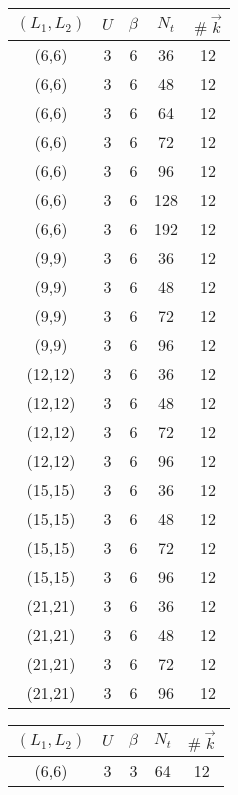\begin{table}[!htb]
  \setlength{\tabcolsep}{4pt}
    \centering
    \begin{tabular}[t]{ccccc}
        $(L_1,L_2)$ & $U$ & $\beta$ & $N_t$ & $\textit{\#}\:\vec{k}$ \\
        \hline
        (6,6) & 3 & 6 & 36 & 12
        \\
        (6,6) & 3 & 6 & 48 & 12
        \\
        (6,6) & 3 & 6 & 64 & 12
        \\
        (6,6) & 3 & 6 & 72 & 12
        \\
        (6,6) & 3 & 6 & 96 & 12
        \\
        (6,6) & 3 & 6 & 128 & 12
        \\
        (6,6) & 3 & 6 & 192 & 12
        \\
        \hline
        (9,9) & 3 & 6 & 36 & 12
        \\
        (9,9) & 3 & 6 & 48 & 12
        \\
        (9,9) & 3 & 6 & 72 & 12
        \\
        (9,9) & 3 & 6 & 96 & 12
        \\
        \hline
        (12,12) & 3 & 6 & 36 & 12
        \\
        (12,12) & 3 & 6 & 48 & 12
        \\
        (12,12) & 3 & 6 & 72 & 12
        \\
        (12,12) & 3 & 6 & 96 & 12
        \\
        \hline
        (15,15) & 3 & 6 & 36 & 12
        \\
        (15,15) & 3 & 6 & 48 & 12
        \\
        (15,15) & 3 & 6 & 72 & 12
        \\
        (15,15) & 3 & 6 & 96 & 12
        \\
        \hline
        (21,21) & 3 & 6 & 36 & 12
        \\
        (21,21) & 3 & 6 & 48 & 12
        \\
        (21,21) & 3 & 6 & 72 & 12
        \\
        (21,21) & 3 & 6 & 96 & 12
        \\
        \hline
    \end{tabular}
    \quad
    \begin{tabular}[t]{ccccc}
      $(L_1,L_2)$ & $U$ & $\beta$ & $N_t$ & $\textit{\#}\:\vec{k}$ \\
      \hline
      (6,6) & 3 & 3 & 64 & 12

\end{tabular}
\end{table}
